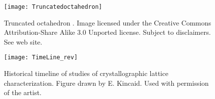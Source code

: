 \documentclass[preprint]{iucr}              %
\begin{document}
{%

\begin{figure}
\caption{Truncated octahedron  \cite{wikipeditrancatedoctahedron}.
Image licensed under the Creative Commons Attribution-Share Alike 3.0 Unported license. Subject to disclaimers.  See web site.
}
\label{fig:truncoctahedron}
\begin{center}
\texttt{[image: Truncatedoctahedron]}
\end{center}
\end{figure}

\begin{figure}
\caption{Historical timeline of studies of crystallographic lattice
characterization.  Figure drawn by E. Kincaid.  Used with
permission of the artist.
}
\label{fig:timeline}
\begin{center}
\texttt{[image: TimeLine\_rev]}
\end{center}
\end{figure}

}
\end{document}
